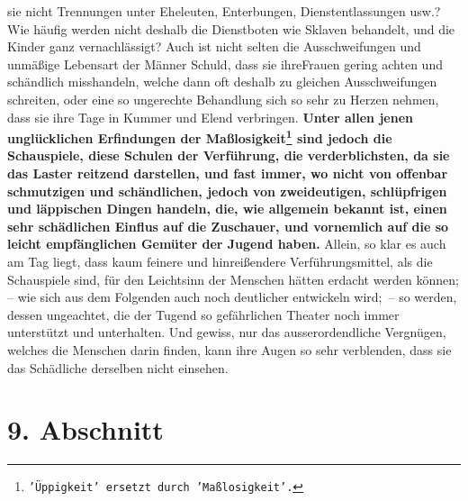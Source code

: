 sie nicht Trennungen unter Eheleuten, Enterbungen, Dienstentlassungen usw.?
Wie häufig werden nicht deshalb die Dienstboten
wie
Sklaven behandelt, und die
Kinder ganz vernachlässigt? Auch ist nicht selten die
Ausschweifungen und
unmäßige Lebensart der Männer Schuld,
dass sie ihreFrauen gering achten und
schändlich misshandeln, welche dann oft deshalb zu gleichen Ausschweifungen
schreiten, oder eine so ungerechte Behandlung sich so sehr zu Herzen nehmen,
dass
sie ihre Tage in Kummer und Elend verbringen.
\label{ref:15_08_schauspiel}
\textbf{Unter allen jenen unglücklichen
Erfindungen der Maßlosigkeit\footnote{\texttt{'Üppigkeit' ersetzt durch
'Maßlosigkeit'.}}
sind jedoch die Schauspiele, diese Schulen der
Verführung, die verderblichsten, da sie das Laster reitzend darstellen, und fast
immer, wo nicht von offenbar schmutzigen und schändlichen, jedoch von
zweideutigen, schlüpfrigen und läppischen Dingen handeln, die, wie allgemein
bekannt ist, einen sehr schädlichen Einflus auf die Zuschauer, und vornemlich
auf die so leicht empfänglichen Gemüter der Jugend haben.} Allein, so klar es
auch am Tag liegt, dass kaum feinere und hinreißendere Verführungsmittel, als
die Schauspiele sind, für den Leichtsinn der Menschen hätten erdacht werden
können; -- wie sich aus dem Folgenden auch noch deutlicher entwickeln wird;~--
so werden, dessen ungeachtet, die der Tugend so gefährlichen Theater noch immer
unterstützt und unterhalten. Und gewiss, nur das ausserordendliche Vergnügen,
welches die Menschen darin finden, kann ihre Augen so sehr verblenden, dass sie
das Schädliche derselben nicht einsehen.

\section{9. Abschnitt} \label{kap15_ab9}

